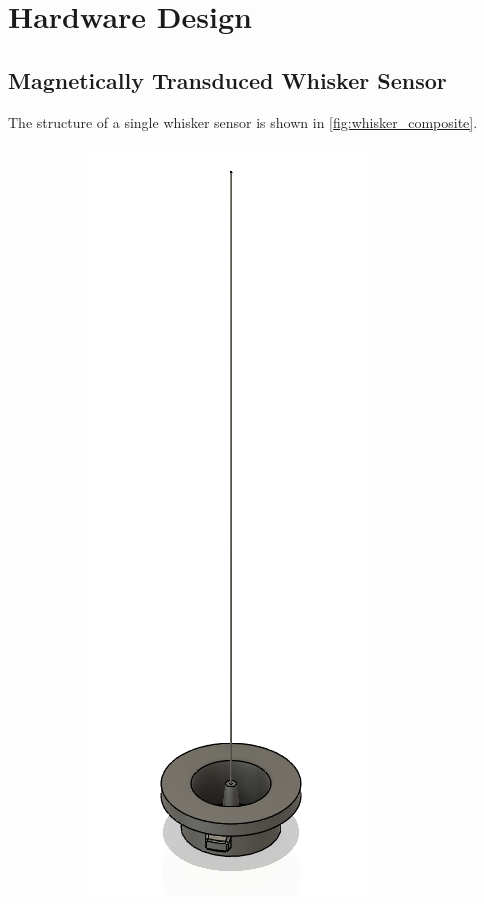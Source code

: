 

\chapter{Hardware Design}


\section{Magnetically Transduced Whisker Sensor}
The structure of a single whisker sensor is shown in \cref{fig:whisker_composite}.

\begin{figure}[ht]
    \centering
    \begin{subfigure}[b]{0.31\textwidth}
        \centering
        \includegraphics[height=0.2\textheight]{figures/whisker}

\end{subfigure}
\end{figure}
